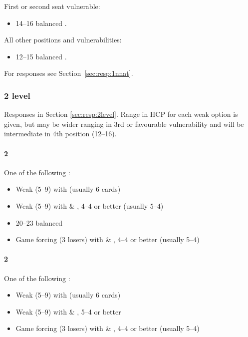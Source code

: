 First or second seat vulnerable:
\begin{itemize}
\item 14--16 balanced .
\end{itemize}

All other positions and vulnerabilities:
\begin{itemize}
\item 12--15 balanced .
\end{itemize}

For responses see Section~\ref{sec:resp:1nnat}.

\newpage 

\subsubsection{2 level}
\label{sec:open:2level}

Responses in Section \ref{sec:resp:2level}. Range in HCP for each weak option
is given, but may be wider ranging in 3rd or favourable vulnerability and will
be intermediate in 4th position (12--16).

\paragraph{2\clubs}
One of the following :
\begin{itemize}
\item Weak (5--9) with \diamonds (usually 6 cards)
\item Weak (5--9) with \hearts \& \spades, 4--4 or better (usually 5--4)
\item 20--23 balanced
\item Game forcing (3 losers) with \hearts \& \spades, 4--4 or better (usually 5--4)
\end{itemize}

\paragraph{2\diamonds}
One of the following :
\begin{itemize}
\item Weak (5--9) with \hearts (usually 6 cards)
\item Weak (5--9) with \spades \& \clubs, 5--4 or better 
\item Game forcing (3 losers) with \spades \& \clubs, 4--4 or better (usually 5--4)
\end{itemize}

